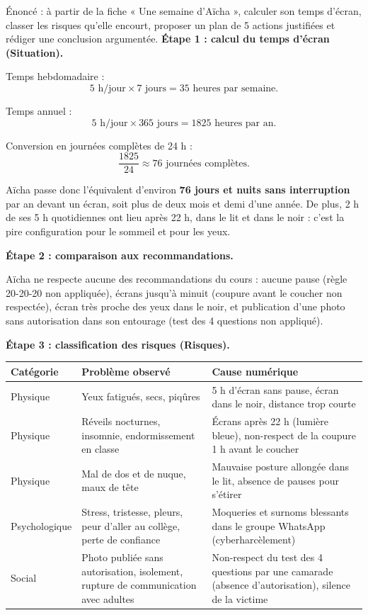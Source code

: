 \documentclass[11pt]{article}
\begin{document}
\begin{exoresolu}
Énoncé : à partir de la fiche « Une semaine d'Aïcha », calculer son temps d'écran, classer les risques qu'elle encourt, proposer un plan de 5 actions justifiées et rédiger une conclusion argumentée.
\tcblower
\textbf{Étape 1 : calcul du temps d'écran (Situation).}

Temps hebdomadaire :
\[ 5 \text{ h/jour} \times 7 \text{ jours} = 35 \text{ heures par semaine.} \]

Temps annuel :
\[ 5 \text{ h/jour} \times 365 \text{ jours} = 1825 \text{ heures par an.} \]

Conversion en journées complètes de 24 h :
\[ \frac{1825}{24} \approx 76 \text{ journées complètes.} \]

Aïcha passe donc l'équivalent d'environ \textbf{76 jours et nuits sans interruption} par an devant un écran, soit plus de deux mois et demi d'une année. De plus, 2 h de ses 5 h quotidiennes ont lieu après 22 h, dans le lit et dans le noir : c'est la pire configuration pour le sommeil et pour les yeux.

\textbf{Étape 2 : comparaison aux recommandations.}

Aïcha ne respecte aucune des recommandations du cours : aucune pause (règle 20-20-20 non appliquée), écrans jusqu'à minuit (coupure avant le coucher non respectée), écran très proche des yeux dans le noir, et publication d'une photo sans autorisation dans son entourage (test des 4 questions non appliqué).

\textbf{Étape 3 : classification des risques (Risques).}

\begin{center}
\begin{tabularx}{\linewidth}{|l|X|X|}
\hline
\rowcolor{popblueL} \textbf{Catégorie} & \textbf{Problème observé} & \textbf{Cause numérique} \\
\hline
Physique & Yeux fatigués, secs, piqûres & 5 h d'écran sans pause, écran dans le noir, distance trop courte \\
\hline
Physique & Réveils nocturnes, insomnie, endormissement en classe & Écrans après 22 h (lumière bleue), non-respect de la coupure 1 h avant le coucher \\
\hline
Physique & Mal de dos et de nuque, maux de tête & Mauvaise posture allongée dans le lit, absence de pauses pour s'étirer \\
\hline
Psychologique & Stress, tristesse, pleurs, peur d'aller au collège, perte de confiance & Moqueries et surnoms blessants dans le groupe WhatsApp (cyberharcèlement) \\
\hline
Social & Photo publiée sans autorisation, isolement, rupture de communication avec adultes & Non-respect du test des 4 questions par une camarade (absence d'autorisation), silence de la victime \\
\hline
\end{tabularx}
\end{center}


\end{exoresolu}
\end{document}
